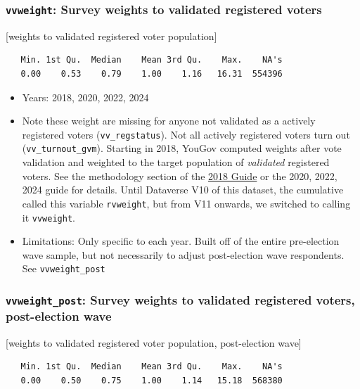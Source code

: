\documentclass[10pt,article,oneside]{memoir}
\begin{document}
\subsubsection{\texorpdfstring{\texttt{vvweight}: Survey weights to
validated registered
voters}{vvweight: Survey weights to validated registered voters}}\label{vvweight-survey-weights-to-validated-registered-voters}

{[}weights to validated registered voter population{]}

\begin{verbatim}
   Min. 1st Qu.  Median    Mean 3rd Qu.    Max.    NA's 
   0.00    0.53    0.79    1.00    1.16   16.31  554396 
\end{verbatim}

\begin{itemize}
\tightlist
\item
  Years: 2018, 2020, 2022, 2024
\item
  Note these weight are missing for anyone not validated as a actively
  registered voters (\texttt{vv\_regstatus}). Not all actively
  registered voters turn out (\texttt{vv\_turnout\_gvm}). Starting in
  2018, YouGov computed weights after vote validation and weighted to
  the target population of \emph{validated} registered voters. See the
  methodology section of the
  \href{https://doi.org/10.7910/DVN/ZSBZ7K}{2018 Guide} or the 2020,
  2022, 2024 guide for details. Until Dataverse V10 of this dataset, the
  cumulative called this variable \texttt{rvweight}, but from V11
  onwards, we switched to calling it \texttt{vvweight}.
\item
  Limitations: Only specific to each year. Built off of the entire
  pre-election wave sample, but not necessarily to adjust post-election
  wave respondents. See \texttt{vvweight\_post}
\end{itemize}

\subsubsection{\texorpdfstring{\texttt{vvweight\_post}: Survey weights
to validated registered voters, post-election
wave}{vvweight\_post: Survey weights to validated registered voters, post-election wave}}\label{vvweight_post-survey-weights-to-validated-registered-voters-post-election-wave}

{[}weights to validated registered voter population, post-election
wave{]}

\begin{verbatim}
   Min. 1st Qu.  Median    Mean 3rd Qu.    Max.    NA's 
   0.00    0.50    0.75    1.00    1.14   15.18  568380 
\end{verbatim}
\end{document}
